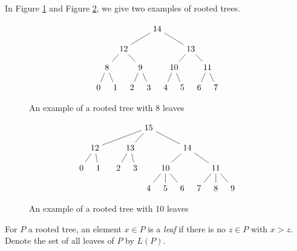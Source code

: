 \documentclass[smallextended, envcountsame, numbook]{svjour3}
\numberwithin{equation}{section}
\begin{document}
\begin{example}
In Figure \ref{fig:tree1} and Figure \ref{fig:tree2}, we give two examples of rooted trees.
\end{example}
\begin{figure}[h!]
\[\begin{tikzpicture}[scale=.7]
  \node (0) at (-4,0) {$0$};
  \node (1) at (-3,0) {$1$};
  \node (2) at (-2,0) {$2$};
  \node (3) at (-1,0) {$3$};
    \node (4) at (0,0) {$4$};
  \node (5) at (1,0) {$5$};
  \node (6) at (2,0) {$6$};
  \node (7) at (3,0) {$7$};
  \node (8) at (-3.5,1.2) {$8$};
  \node (9) at (-1.5,1.2) {$9$};
  \node (10) at (.5,1.2) {$10$};
  \node (11) at (2.5,1.2) {$11$};
    \node (12) at (-2.5,2.3) {$12$};
  \node (13) at (1.5,2.3) {$13$};
  \node (14) at (-.5,3.5) {$14$};
  \draw (0)--(8);
  \draw (1)--(8);
  \draw (2)--(9);
  \draw (3)--(9);
  \draw (4)--(10);
  \draw (5)--(10);
  \draw (6)--(11);
  \draw (7)--(11);
  \draw (8)--(12);
  \draw (9)--(12);
  \draw (10)--(13);
  \draw (11)--(13);
  \draw (12)--(14);
  \draw (13)--(14);
\end{tikzpicture}\]
\caption{\label{fig:tree1} An example of a rooted tree with $8$ leaves}
\end{figure}


\begin{figure}[h!]
\[\begin{tikzpicture}[scale=.7]
  \node (0) at (-4,0) {$0$};
  \node (1) at (-3,0) {$1$};
  \node (2) at (-1.8,0) {$2$};
  \node (3) at (-0.8,0) {$3$};
    \node (4) at (0,-1.2) {$4$};
  \node (5) at (1,-1.2) {$5$};
  \node (6) at (2,-1.2) {$6$};
  \node (7) at (3,-1.2) {$7$};
  \node (8) at (4,-1.2) {$8$};
  \node (9) at (5,-1.2) {$9$};
  \node (10) at (1, 0) {$10$};
  \node (11) at (4,0) {$11$};
    \node (12) at (-3.2,1.2) {$12$};
  \node (13) at (-1.1,1.2) {$13$};
  \node (14) at (2.3,1.2) {$14$};
  \node (15) at (0,2.4) {$15$};
 \draw (0)--(12);
  \draw (1)--(12);
  \draw (2)--(13);
  \draw (3)--(13);
  \draw (4)--(10);
  \draw (5)--(10);
  \draw (6)--(10);
  \draw (7)--(11);
  \draw (8)--(11);
  \draw (9)--(11);
  \draw (10)--(14);
  \draw (11)--(14);
  \draw (12)--(15);
  \draw (13)--(15);
  \draw (14)--(15);
\end{tikzpicture}\]
\caption{\label{fig:tree2} An example of a rooted tree with 10  leaves}
\end{figure}

\begin{definition}
For $P$ a rooted tree, an element $x \in P$ is a {\it leaf} if there is no $z \in P$ with $x > z$. Denote the set of all leaves of $P$ by $L(P)$.
\end{definition}
\end{document}
